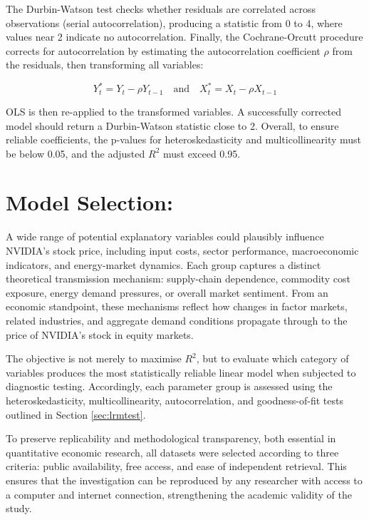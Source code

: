 \documentclass[12pt]{article}
\begin{document}
    The Durbin-Watson test checks whether residuals are correlated across observations (serial autocorrelation), producing a statistic from 0 to 4, where values near 2 indicate no autocorrelation. Finally, the Cochrane-Orcutt procedure corrects for autocorrelation by estimating the autocorrelation coefficient $\rho$ from the residuals, then transforming all variables:
    
    \[
    Y_t^* = Y_t - \rho Y_{t-1} \quad \text{and} \quad X_t^* = X_t - \rho X_{t-1}
    \]
    
    OLS is then re-applied to the transformed variables. A successfully corrected model should return a Durbin-Watson statistic close to 2. Overall, to ensure reliable coefficients, the p-values for heteroskedasticity and multicollinearity must be below 0.05, and the adjusted $R^2$ must exceed 0.95.

    \newpage
    
    \section{Model Selection:}
    
    A wide range of potential explanatory variables could plausibly influence NVIDIA's stock price, including input costs, sector performance, macroeconomic indicators, and energy-market dynamics. Each group captures a distinct theoretical transmission mechanism: supply-chain dependence, commodity cost exposure, energy demand pressures, or overall market sentiment. From an economic standpoint, these mechanisms reflect how changes in factor markets, related industries, and aggregate demand conditions propagate through to the price of NVIDIA's stock in equity markets.
    
    The objective is not merely to maximise $R^2$, but to evaluate which category of variables produces the most statistically reliable linear model when subjected to diagnostic testing. Accordingly, each parameter group is assessed using the heteroskedasticity, multicollinearity, autocorrelation, and goodness-of-fit tests outlined in Section \ref{sec:lrmtest}.
    
    To preserve replicability and methodological transparency, both essential in quantitative economic research, all datasets were selected according to three criteria: public availability, free access, and ease of independent retrieval. This ensures that the investigation can be reproduced by any researcher with access to a computer and internet connection, strengthening the academic validity of the study.
\end{document}
